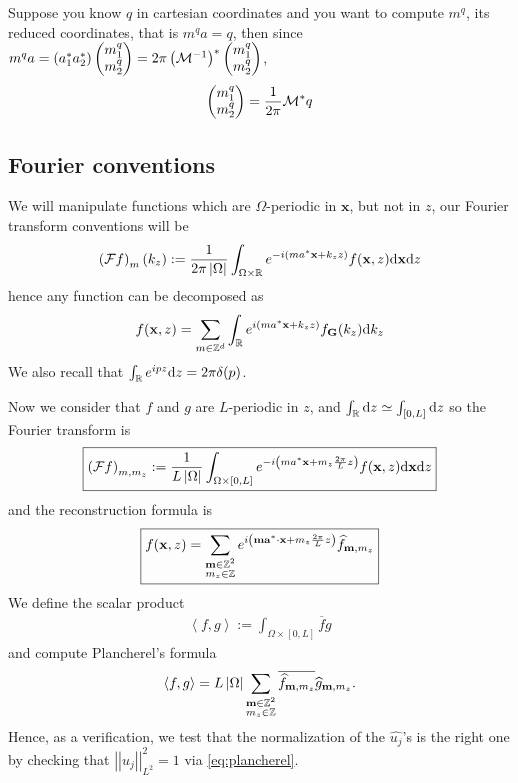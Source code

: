 \documentclass[11pt,a4paper,reqno,french,tikz]{amsart}
\def\d{{\rm d}}
\newcommand{\pa}[1]{\left( #1 \right)} %
\newcommand{\ab}[1]{\left|#1\right|} %
\newcommand{\ps}[1]{\left< #1 \right>} %
\newcommand{\nor}[2]{ \left| \! \left| #1 \right| \! \right|_{#2} } %
\newcommand{\f}[2]{\frac{#1}{#2}} %
\newcommand{\mat}[1]{\begin{pmatrix} #1 \end{pmatrix}} %
\def\bG{{\mathbf G}}
\def\ba{{\mathbf a}}
\def\bx{{\mathbf x}}
\def\bmm{{\mathbf m}}
\begin{document}
Suppose you know $q$ in cartesian coordinates and you want to compute $m^q$, its reduced coordinates, that is $m^q a = q$, then since $m^q a = \pa{a_1^* a_2^*} \mat{m^q_1 \\ m^q_2} = 2\pi \pa{\cM^{-1}}^* \mat{m^q_1 \\ m^q_2}$,
\begin{align}\label{eq:inv_q}
\mat{m^q_1 \\ m^q_2} = \f{1}{2\pi} \cM^* q
\end{align}

\subsection{Fourier conventions}%
\label{sub:fourier_conventions}

We will manipulate functions which are $\Omega$-periodic in $\bx$, but not in $z$, our Fourier transform conventions will be
\begin{align*}
	\pa{\cF f}_m(k_z) := \f{1}{2\pi \ab{\Omega}} \int_{\Omega\times\R} e^{-i\pa{ma^* \bx + k_z z}} f(\bx,z) \d \bx \d z
\end{align*}
hence any function can be decomposed as
\begin{align*}
f(\bx,z) = \sum_{m \in \Z^d} \int_\R e^{i\pa{ma^* \bx + k_z z}} f_\bG(k_z) \d k_z
\end{align*}
We also recall that $\int_\R e^{ipz} \d z = 2\pi \delta(p)$.


Now we consider that $f$ and $g$ are $L$-periodic in $z$, and $\int_\R \d z \simeq \int_{[0,L]} \d z$ so the Fourier transform is
\begin{align*}
	\boxed{\pa{\cF f}_{m,m_z} := \f{1}{L\ab{\Omega}} \int_{\Omega\times [0,L]} e^{-i\pa{ma^* \bx + m_z \f{2\pi}{L} z}} f(\bx,z) \d \bx \d z}
\end{align*}
and the reconstruction formula is
\begin{align}\label{eq:dec_four}
\boxed{f(\bx,z) =  \sum_{\substack{\bmm \in \Z^2 \\ m_z \in \Z}}  e^{i\pa{\bmm \ba^* \cdot \bx + m_z \f{2\pi}L z}} \widehat{f}_{\bmm,m_z}}
\end{align}
We define the scalar product
\begin{align*}
\ps{f,g} := \int_{\Omega\times [0,L]} \overline{f}g
\end{align*}
and compute Plancherel's formula
\begin{align}\label{eq:plancherel}
\ps{f,g} = L\ab{\Omega} \sum_{\substack{\bmm \in \Z^2 \\ m_z \in \Z}} \overline{\widehat{f}_{\bmm,m_z}} \widehat{g}_{\bmm,m_z}.
\end{align}
Hence, as a verification, we test that the normalization of the $\widehat{u_j}$'s is the right one by checking that $\nor{u_j}{L^2}^2 = 1$ via \eqref{eq:plancherel}.
\end{document}
